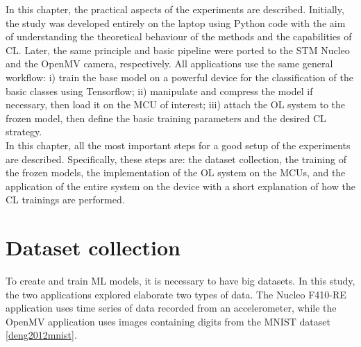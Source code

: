 \documentclass[12pt]{report}
\begin{document}
In this chapter, the practical aspects of the experiments are described. Initially, the study was developed entirely on the laptop using Python code with the aim of understanding the theoretical behaviour of the methods and the capabilities of CL. Later, the same principle and basic pipeline were ported to the STM Nucleo and the OpenMV camera, respectively. All applications use the same general workflow: i) train the base model on a powerful device for the classification of the basic classes using Tensorflow; ii) manipulate and compress the model if necessary, then load it on the MCU of interest; iii) attach the OL system to the frozen model, then define the basic training parameters and the desired CL strategy. \\
In this chapter, all the most important steps for a good setup of the experiments are described. Specifically, these steps are: the dataset collection, the training of the frozen models, the implementation of the OL system on the MCUs, and the application of the entire system on the device with a short explanation of how the CL trainings are performed.

\section{Dataset collection}
To create and train ML models, it is necessary to have big datasets. In this study, the two applications explored elaborate two types of data. The Nucleo F410-RE application uses time series of data recorded from an accelerometer, while the OpenMV application uses images containing digits from the MNIST dataset \ref{deng2012mnist}. \\
\end{document}
